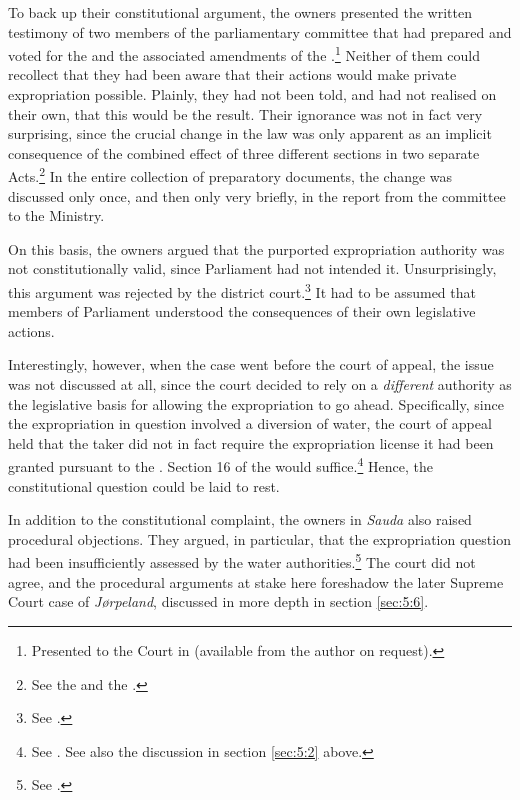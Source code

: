To back up their constitutional argument, the owners presented the written testimony of two members of the parliamentary committee that had prepared and voted for the \cite{wra00} and the associated amendments of the \cite{ea59}.\footnote{Presented to the Court in \cite{sauda07} (available from the author on request).} Neither of them could recollect that they had been aware that their actions would make private expropriation possible. Plainly, they had not been told, and had not realised on their own, that this would be the result. Their ignorance was not in fact very surprising, since the crucial change in the law was only apparent as an implicit consequence of the combined effect of three different sections in two separate Acts.\footnote{See the \dni\cite[51]{wra00} and the \dni\cite[2, 3]{ea59}.} In the entire collection of preparatory documents, the change was discussed only once, and then only very briefly, in the report from the committee to the Ministry.

On this basis, the owners argued that the purported expropriation authority was not constitutionally valid, since Parliament had not intended it. Unsurprisingly, this argument was rejected by the district court.\footnote{See \cite{sauda07}.} It had to be assumed that members of Parliament understood the consequences of their own legislative actions. 

Interestingly, however, when the case went before the court of appeal, the issue was not discussed at all, since the court decided to rely on a {\it different} authority as the legislative basis for allowing the expropriation to go ahead. Specifically, since the expropriation in question involved a diversion of water, the court of appeal held that the taker did not in fact require the expropriation license it had been granted pursuant to the \cite{ea59}. Section 16 of the \cite{wra17} would suffice.\footnote{See \cite{sauda09}. See also the discussion in section \ref{sec:5:2} above.} Hence, the constitutional question could be laid to rest.

In addition to the constitutional complaint, the owners in {\it Sauda} also raised procedural objections. They argued, in particular, that the expropriation question had been insufficiently assessed by the water authorities.\footnote{See \cite{sauda09}.} The court did not agree, and the procedural arguments at stake here foreshadow the later Supreme Court case of {\it Jørpeland}, discussed in more depth in section \ref{sec:5:6}.

